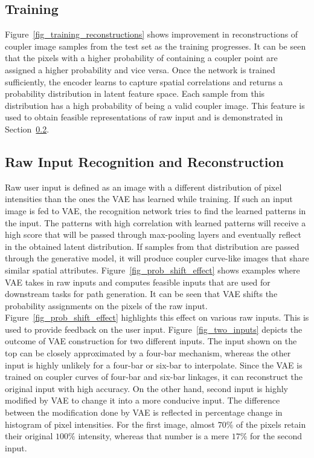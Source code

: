\subsection{Training}
Figure~\ref{fig_training_reconstructions} shows improvement in reconstructions of coupler image samples from the test set as the training progresses. It can be seen that the pixels with a higher probability of containing a coupler point are assigned a higher probability and vice versa. 
Once the network is trained sufficiently, the encoder learns to capture spatial correlations and returns a probability distribution in latent feature space. Each sample from this distribution has a high probability of being a valid coupler image. 
This feature is used to obtain feasible representations of raw input and is demonstrated in Section~\ref{subsec_raw_recogn_rec}. 

\subsection{Raw Input Recognition and Reconstruction}\label{subsec_raw_recogn_rec}
Raw user input is defined as an image with a different distribution of pixel intensities than the ones the VAE has learned while training. 
If such an input image is fed to VAE, the recognition network tries to find the learned patterns in the input. The patterns with high correlation with learned patterns will receive a high score that will be passed through max-pooling layers and eventually reflect in the obtained latent distribution. If samples from that distribution are passed through the generative model, it will produce coupler curve-like images that share similar spatial attributes.
Figure~\ref{fig_prob_shift_effect} shows examples where VAE takes in raw inputs and computes feasible inputs that are used for downstream tasks for path generation. It can be seen that VAE shifts the probability assignments on the pixels of the raw input. Figure~\ref{fig_prob_shift_effect} highlights this effect on various raw inputs. This is used to provide feedback on the user input.    
Figure~\ref{fig_two_inputs} depicts the outcome of VAE construction for two different inputs. The input shown on the top can be closely approximated by a four-bar mechanism, whereas the other input is highly unlikely for a four-bar or six-bar to interpolate. Since the VAE is trained on coupler curves of four-bar and six-bar linkages, it can reconstruct the original input with high accuracy. On the other hand, second input is highly modified by VAE to change it into a more conducive input. The difference between the modification done by VAE is reflected in percentage change in histogram of pixel intensities. For the first image, almost $70\%$ of the pixels retain their original $100\%$ intensity, whereas that number is a mere $17\%$ for the second input. 

